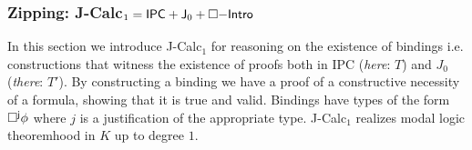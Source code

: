 \documentclass[11pt]{eptcs} %
\begin{document}
\subsubsection{Zipping: {\sf J-Calc}$_1={\sf IPC}+ {\sf J}_0+\Box{\sf-Intro}$}\label{sec:jcalc1}
In this section we introduce {\sf J-Calc$_1$} for reasoning on the existence of  bindings i.e. constructions that witness the existence of proofs both in {\sf IPC} (\textit{here}: $T$) and {\sf $J_0$} (\textit{there}: $T'$).
By constructing a binding we have a proof of a constructive necessity of a formula, showing that it is true and valid. Bindings have types of the form ${\sf\Box^{j}\phi}$ where $j$ is a justification of the appropriate type. {\sf J-Calc$_1$} realizes modal logic theoremhood in $K$ up to degree $1$. 
\end{document}
